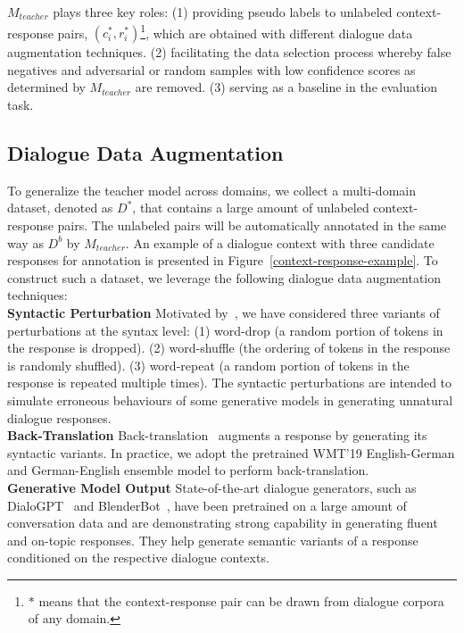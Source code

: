 \documentclass[letterpaper]{article} \usepackage{aaai22}  \usepackage{times}  \usepackage{helvet}  \usepackage{courier}  \usepackage[hyphens]{url}  \usepackage{graphicx} \urlstyle{rm} \def\UrlFont{\rm}  \usepackage{natbib}  \usepackage{caption} \DeclareCaptionStyle{ruled}{labelfont=normalfont,labelsep=colon,strut=off} \frenchspacing  \setlength{\pdfpagewidth}{8.5in}  \setlength{\pdfpageheight}{11in}  \usepackage{algorithm}
\begin{document}
$M_{teacher}$ plays three key roles: (1) providing pseudo labels to unlabeled context-response pairs, $(c_i^{\text{*}}, r_i^{\text{*}})$\footnote{$*$ means that the context-response pair can be drawn from dialogue corpora of any domain.}, which are obtained with different dialogue data augmentation techniques. (2) facilitating the data selection process whereby false negatives and adversarial or random samples with low confidence scores as determined by $M_{teacher}$ are removed. (3) serving as a baseline in the evaluation task.

\subsection{Dialogue Data Augmentation}
\label{subsec:dialog-augmentation}

To generalize the teacher model across domains, we collect a multi-domain dataset, denoted as $D^{\text{*}}$, that contains a large amount of unlabeled context-response pairs. The unlabeled pairs will be automatically annotated in the same way as $D^b$ by $M_{teacher}$. An example of a dialogue context with three candidate responses for annotation is presented in Figure~\ref{context-response-example}. To construct such a dataset, we leverage the following dialogue data augmentation techniques:
\\

\noindent\textbf{Syntactic Perturbation}
Motivated by~\citep{sinha-etal-2020-learning}, we have considered three variants of perturbations at the syntax level: (1) word-drop (a random portion of tokens in the response is dropped). (2) word-shuffle (the ordering of tokens in the response is randomly shuffled). (3) word-repeat (a random portion of tokens in the response is repeated multiple times). The syntactic perturbations are intended to simulate erroneous behaviours of some generative models in generating unnatural dialogue responses.
\\

\noindent\textbf{Back-Translation}
Back-translation~\citep{edunov-etal-2018-understanding} augments a response by generating its syntactic variants. In practice, we adopt the pretrained WMT’19 English-German and German-English ensemble model to perform back-translation. 
\\  

\noindent\textbf{Generative Model Output}
State-of-the-art dialogue generators, such as DialoGPT~\citep{zhang-etal-2020-dialogpt} and BlenderBot~\citep{roller-etal-2021-recipes}, have been pretrained on a large amount of conversation data and are demonstrating strong capability in generating fluent and on-topic responses. They help generate semantic variants of a response conditioned on the respective dialogue contexts.  
\\
\end{document}
